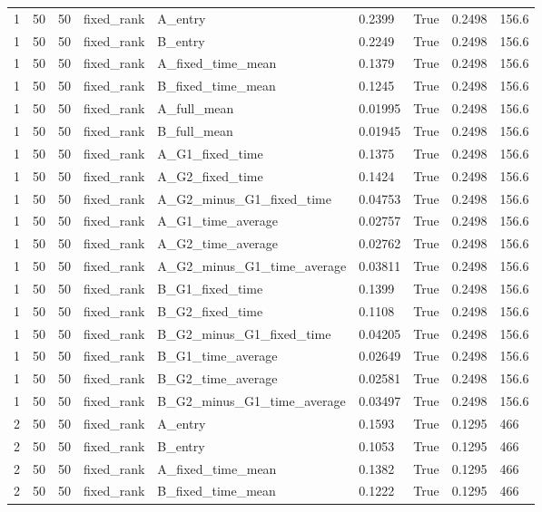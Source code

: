 \begin{longtable}{lllllllll}
1 & 50 & 50 & fixed\_rank & A\_entry & 0.2399 & True & 0.2498 & 156.6 \\
1 & 50 & 50 & fixed\_rank & B\_entry & 0.2249 & True & 0.2498 & 156.6 \\
1 & 50 & 50 & fixed\_rank & A\_fixed\_time\_mean & 0.1379 & True & 0.2498 & 156.6 \\
1 & 50 & 50 & fixed\_rank & B\_fixed\_time\_mean & 0.1245 & True & 0.2498 & 156.6 \\
1 & 50 & 50 & fixed\_rank & A\_full\_mean & 0.01995 & True & 0.2498 & 156.6 \\
1 & 50 & 50 & fixed\_rank & B\_full\_mean & 0.01945 & True & 0.2498 & 156.6 \\
1 & 50 & 50 & fixed\_rank & A\_G1\_fixed\_time & 0.1375 & True & 0.2498 & 156.6 \\
1 & 50 & 50 & fixed\_rank & A\_G2\_fixed\_time & 0.1424 & True & 0.2498 & 156.6 \\
1 & 50 & 50 & fixed\_rank & A\_G2\_minus\_G1\_fixed\_time & 0.04753 & True & 0.2498 & 156.6 \\
1 & 50 & 50 & fixed\_rank & A\_G1\_time\_average & 0.02757 & True & 0.2498 & 156.6 \\
1 & 50 & 50 & fixed\_rank & A\_G2\_time\_average & 0.02762 & True & 0.2498 & 156.6 \\
1 & 50 & 50 & fixed\_rank & A\_G2\_minus\_G1\_time\_average & 0.03811 & True & 0.2498 & 156.6 \\
1 & 50 & 50 & fixed\_rank & B\_G1\_fixed\_time & 0.1399 & True & 0.2498 & 156.6 \\
1 & 50 & 50 & fixed\_rank & B\_G2\_fixed\_time & 0.1108 & True & 0.2498 & 156.6 \\
1 & 50 & 50 & fixed\_rank & B\_G2\_minus\_G1\_fixed\_time & 0.04205 & True & 0.2498 & 156.6 \\
1 & 50 & 50 & fixed\_rank & B\_G1\_time\_average & 0.02649 & True & 0.2498 & 156.6 \\
1 & 50 & 50 & fixed\_rank & B\_G2\_time\_average & 0.02581 & True & 0.2498 & 156.6 \\
1 & 50 & 50 & fixed\_rank & B\_G2\_minus\_G1\_time\_average & 0.03497 & True & 0.2498 & 156.6 \\
2 & 50 & 50 & fixed\_rank & A\_entry & 0.1593 & True & 0.1295 & 466 \\
2 & 50 & 50 & fixed\_rank & B\_entry & 0.1053 & True & 0.1295 & 466 \\
2 & 50 & 50 & fixed\_rank & A\_fixed\_time\_mean & 0.1382 & True & 0.1295 & 466 \\
2 & 50 & 50 & fixed\_rank & B\_fixed\_time\_mean & 0.1222 & True & 0.1295 & 466 \\

\end{longtable}
